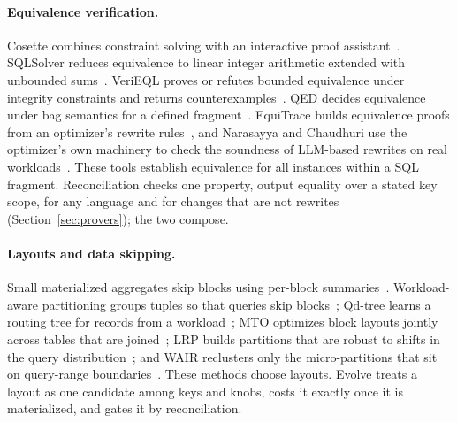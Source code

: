 \paragraph{Equivalence verification.} Cosette combines constraint solving with
an interactive proof assistant~\cite{cosette}. SQLSolver reduces equivalence to
linear integer arithmetic extended with unbounded sums~\cite{sqlsolver}.
VeriEQL proves or refutes bounded equivalence under integrity constraints and
returns counterexamples~\cite{verieql}. QED decides equivalence under bag
semantics for a defined fragment~\cite{qed}. EquiTrace builds equivalence
proofs from an optimizer's rewrite rules~\cite{equitrace}, and Narasayya and
Chaudhuri use the optimizer's own machinery to check the soundness of LLM-based
rewrites on real workloads~\cite{narasayya2026verify}. These tools establish
equivalence for all instances within a SQL fragment. Reconciliation checks one
property, output equality over a stated key scope, for any language and for
changes that are not rewrites (Section~\ref{sec:provers}); the two compose.

\paragraph{Layouts and data skipping.} Small materialized aggregates skip blocks
using per-block summaries~\cite{moerkotte1998sma}. Workload-aware partitioning
groups tuples so that queries skip blocks~\cite{sun2014skipping}; Qd-tree learns
a routing tree for records from a workload~\cite{qdtree}; MTO optimizes block
layouts jointly across tables that are joined~\cite{ding2021layouts}; LRP
builds partitions that are robust to shifts in the query
distribution~\cite{lrp2025}; and WAIR reclusters only the micro-partitions that sit
on query-range boundaries~\cite{recluster2026}. These methods choose layouts.
Evolve treats a layout as one candidate among keys and knobs, costs it exactly
once it is materialized, and gates it by reconciliation.

